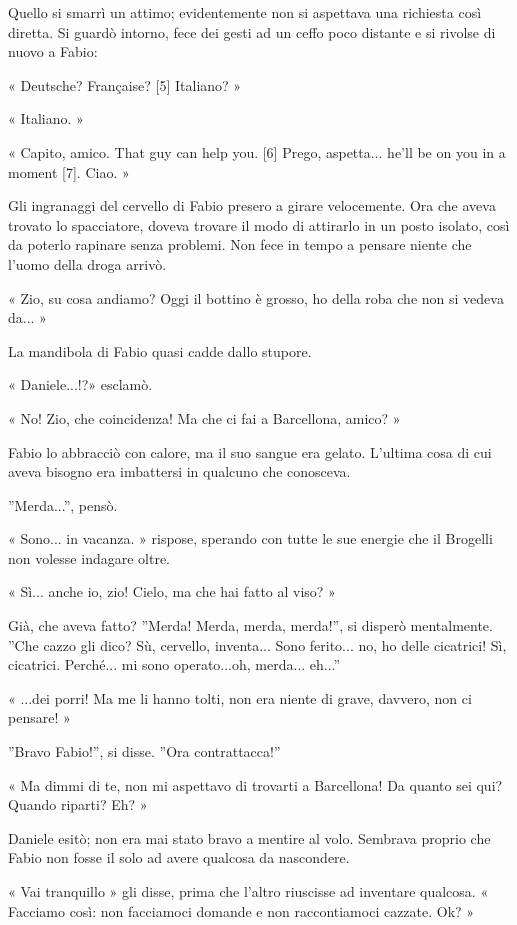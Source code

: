 Quello si smarrì un attimo; evidentemente non si aspettava una richiesta così diretta. Si guardò intorno, fece dei gesti ad un ceffo poco distante e si rivolse di nuovo a Fabio:

« Deutsche? Française? [5] Italiano? »

« Italiano. »

« Capito, amico. That guy can help you. [6] Prego, aspetta... he'll be on you in a moment [7]. Ciao. »

Gli ingranaggi del cervello di Fabio presero a girare velocemente. Ora che aveva trovato lo spacciatore, doveva trovare il modo di attirarlo in un posto isolato, così da poterlo rapinare senza problemi. Non fece in tempo a pensare niente che l'uomo della droga arrivò.

« Zio, su cosa andiamo? Oggi il bottino è grosso, ho della roba che non si vedeva da... »

La mandibola di Fabio quasi cadde dallo stupore.

« Daniele...!?» esclamò.

« No! Zio, che coincidenza! Ma che ci fai a Barcellona, amico? »

Fabio lo abbracciò con calore, ma il suo sangue era gelato. L'ultima cosa di cui aveva bisogno era imbattersi in qualcuno che conosceva.

''Merda...'', pensò.

« Sono... in vacanza. » rispose, sperando con tutte le sue energie che il Brogelli non volesse indagare oltre.

« Sì... anche io, zio! Cielo, ma che hai fatto al viso? »

Già, che aveva fatto? ''Merda! Merda, merda, merda!'', si disperò mentalmente. ''Che cazzo gli dico? Sù, cervello, inventa... Sono ferito... no, ho delle cicatrici! Sì, cicatrici. Perché... mi sono operato...oh, merda... eh...''

« ...dei porri! Ma me li hanno tolti, non era niente di grave, davvero, non ci pensare! »

''Bravo Fabio!'', si disse. ''Ora contrattacca!''

« Ma dimmi di te, non mi aspettavo di trovarti a Barcellona! Da quanto sei qui? Quando riparti? Eh? »

Daniele esitò; non era mai stato bravo a mentire al volo. Sembrava proprio che Fabio non fosse il solo ad avere qualcosa da nascondere.

« Vai tranquillo » gli disse, prima che l'altro riuscisse ad inventare qualcosa. « Facciamo così: non facciamoci domande e non raccontiamoci cazzate. Ok? »

